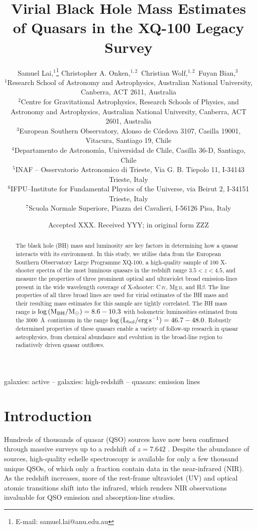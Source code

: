 \documentclass[fleqn,usenatbib]{mnras}
\title[XQ-100 Black Hole Mass]{Virial Black Hole Mass Estimates of Quasars in the XQ-100 Legacy Survey}
\author[S. Lai et al.]{Samuel Lai,$^{1}$\orcidSamuel\thanks{E-mail: samuel.lai@anu.edu.au}
Christopher A. Onken,$^{1,2}$\orcidChrisO\,
Christian Wolf,$^{1,2}$\orcidChrisW\,
Fuyan Bian,$^{3}$\orcidFuyan\,
\newauthor{Guido Cupani,$^{4,5}$\orcidGuido\,
Sebastian Lopez$^{4}$\orcidSebastian\,
and Valentina D'Odorico,$^{5, 6, 7}$\orcidValentina\,
}
\\
$^{1}$Research School of Astronomy and Astrophysics, Australian National University, Canberra, ACT 2611, Australia\\
$^{2}$Centre for Gravitational Astrophysics, Research Schools of Physics, and Astronomy and Astrophysics, Australian National University, Canberra, ACT 2601, Australia\\
$^{3}$European Southern Observatory, Alonso de C\'{o}rdova 3107, Casilla 19001, Vitacura, Santiago 19, Chile\\
$^{4}$Departamento de Astronom\'{\i}a, Universidad de Chile, Casilla 36-D, Santiago, Chile\\
$^{5}$INAF – Osservatorio Astronomico di Trieste, Via G. B. Tiepolo 11, I-34143 Trieste, Italy\\
$^{6}$IFPU–Institute for Fundamental Physics of the Universe, via Beirut 2, I-34151 Trieste, Italy\\
$^{7}$Scuola Normale Superiore, Piazza dei Cavalieri, I-56126 Pisa, Italy\\
}
\date{Accepted XXX. Received YYY; in original form ZZZ}
\newcommand{\mgii}{Mg\,\textsc{ii}}
\newcommand{\civ}{C\,\textsc{iv}}
\newcommand{\hbeta}{H\textsc{$\beta$}}
\begin{document}
\label{firstpage}
\pagerange{\pageref{firstpage}--\pageref{lastpage}}
\maketitle

\begin{abstract}
The black hole (BH) mass and luminosity are key factors in determining how a quasar interacts with its environment. In this study, we utilise data from the European Southern Observatory Large Programme XQ-100, a high-quality sample of 100 X-shooter spectra of the most luminous quasars in the redshift range $3.5 < z < 4.5$, and measure the properties of three prominent optical and ultraviolet broad emission-lines present in the wide wavelength coverage of X-shooter: \civ, \mgii, and \hbeta. The line properties of all three broad lines are used for virial estimates of the BH mass and their resulting mass estimates for this sample are tightly correlated. The BH mass range is $\log{(\rm{M_{BH}}/\rm{M_\odot})} = 8.6-10.3$ with bolometric luminosities estimated from the 3000~\AA\ continuum in the range $\log{(\rm{L_{bol}}/\rm{erg\,s^{-1}})} = 46.7-48.0$. Robustly determined properties of these quasars enable a variety of follow-up research in quasar astrophysics, from chemical abundance and evolution in the broad-line region to radiatively driven quasar outflows. 
\end{abstract}

\begin{keywords}
galaxies: active -- galaxies: high-redshift -- quasars: emission lines
\end{keywords}



\section{Introduction}
Hundreds of thousands of quasar (QSO) sources have now been confirmed through massive surveys \citep[e.g.,][]{Flesch_2015_HMQ, Yao_2019, Lyke_2020} up to a redshift of $z = 7.642$ \citep{Wang_2021_z7.642}. Despite the abundance of sources, high-quality echelle spectroscopy is available for only a few thousand unique QSOs, of which only a fraction contain data in the near-infrared (NIR). As the redshift increases, more of the rest-frame ultraviolet (UV) and optical atomic transitions shift into the infrared, which renders NIR observations invaluable for QSO emission and absorption-line studies. 
\end{document}
